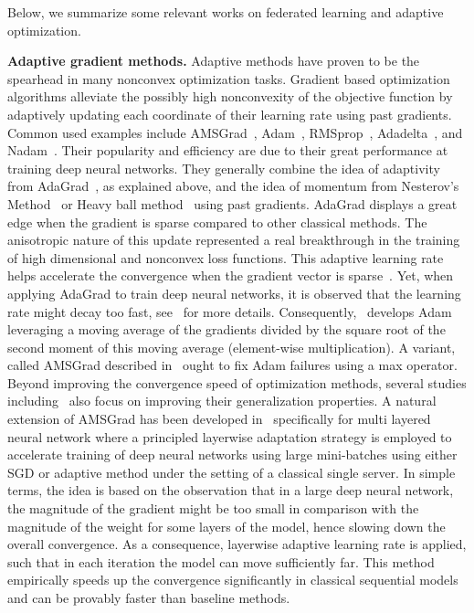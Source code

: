 \documentclass[twoside]{article}
\begin{document}
Below, we summarize some relevant works on federated learning and adaptive optimization.

\vspace{0.1in}
\noindent\textbf{Adaptive gradient methods.}
Adaptive methods have proven to be the spearhead in many nonconvex optimization tasks.
Gradient based optimization algorithms alleviate the possibly high nonconvexity of the objective function by adaptively updating each coordinate of their learning rate using past gradients. 
Common used examples include AMSGrad~\citep{reddi2019convergence}, Adam~\citep{KB15}, RMSprop~\citep{TH12}, Adadelta~\citep{Z12}, and Nadam~\citep{D16}.
Their popularity and efficiency are due to their great performance at training deep neural networks.
They generally combine the idea of adaptivity from AdaGrad~\citep{DHS11,mcmahan2010adaptive}, as explained above, and the idea of momentum from Nesterov's Method~\citep{N04} or Heavy ball method~\citep{P64} using past gradients.
AdaGrad displays a great edge when the gradient is sparse compared to other classical methods.
The anisotropic nature of this update represented a real breakthrough in the training of high dimensional and nonconvex loss functions.
This adaptive learning rate helps accelerate the convergence when the gradient vector is sparse~\citep{DHS11}. Yet, when applying AdaGrad to train deep neural networks, it is observed that the learning rate might decay too fast, see~\citet{KB15} for more details.
Consequently,~\cite{KB15} develops Adam leveraging a moving average of the gradients divided by the square root of the second moment of this moving average (element-wise multiplication).
A variant, called AMSGrad described in~\citet{reddi2019convergence} ought to fix Adam failures using a max operator. Beyond improving the convergence speed of optimization methods, several studies including~\citet{zhou2020towards} also focus on improving their generalization properties.
A natural extension of AMSGrad has been developed in~\citet{you2019large} specifically for multi layered neural network where a principled layerwise adaptation strategy is employed to accelerate training of deep neural networks using large mini-batches using either SGD or adaptive method under the setting of a classical single server. 
In simple terms, the idea is based on the observation that in a large deep neural network, the magnitude of the gradient might be too small in comparison with the magnitude of the weight for some layers of the model, hence slowing down the overall convergence. 
As a consequence, layerwise adaptive learning rate is applied, such that in each iteration the model can move sufficiently far. 
This method empirically speeds up the convergence significantly in classical sequential models and can be provably faster than baseline methods.
\end{document}
